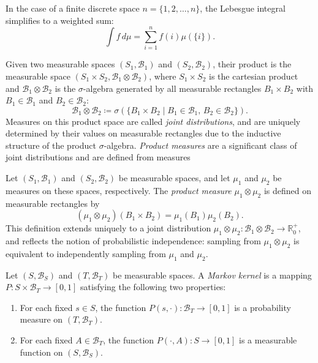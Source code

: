 In the case of a finite discrete space $n = \{1, 2, \dots, n\}$, the Lebesgue integral simplifies to a weighted sum:
$$
\int f \, d\mu = \sum_{i=1}^n f(i) \mu(\{i\}).
$$

Given two measurable spaces $(S_1, \mathcal{B}_1)$ and $(S_2, \mathcal{B}_2)$, their product is the measurable space $(S_1 \times S_2, \mathcal{B}_1 \otimes \mathcal{B}_2)$, where $S_1  \times S_2$ is the cartesian product and $\mathcal{B}_1 \otimes \mathcal{B}_2$ is the $\sigma$-algebra generated by all measurable rectangles $B_1 \times B_2$ with $B_1 \in \mathcal{B}_1$ and $B_2 \in \mathcal{B}_2$:
$$
\mathcal{B}_1 \otimes \mathcal{B}_2 \coloneqq \sigma\left(\{ B_1 \times B_2 \mid B_1 \in \mathcal{B}_1,\, B_2 \in \mathcal{B}_2 \}\right).
$$
Measures on this product space are called \emph{joint distributions}, and are uniquely determined by their values on measurable rectangles due to the inductive structure of the product $\sigma$-algebra. \emph{Product measures} are a significant class of joint distributions and are defined from measures

\begin{definition} 
   Let $(S_1, \mathcal{B}_1)$ and $(S_2, \mathcal{B}_2)$ be measurable spaces, and let $\mu_1$ and $\mu_2$ be measures on these spaces, respectively. The \emph{product measure} $\mu_1 \otimes \mu_2$ is  defined on measurable rectangles by
$$
(\mu_1 \otimes \mu_2)(B_1 \times B_2) = \mu_1(B_1)\mu_2(B_2).
$$
This definition extends uniquely to a joint distribution $\mu_1 \otimes \mu_2: \mathcal{B}_1 \otimes \mathcal{B}_2 \to \mathbb{R}_0^+$, and reflects the notion of probabilistic independence: sampling from $\mu_1 \otimes \mu_2$ is equivalent to independently sampling from $\mu_1$ and $\mu_2$.
\end{definition}


\begin{definition}
Let $(S, \mathcal{B}_S)$ and $(T, \mathcal{B}_T)$ be measurable spaces. A \emph{Markov kernel} is a mapping $P : S \times \mathcal{B}_T \to [0,1]$
satisfying the following two properties:
\begin{enumerate}
    \item For each fixed $s \in S$, the function $P(s, \cdot) : \mathcal{B}_T \to [0,1]$ is a probability measure on $(T, \mathcal{B}_T)$.
    \item For each fixed $A \in \mathcal{B}_T$, the function $P(\cdot, A) : S \to [0,1]$ is a measurable function on $(S, \mathcal{B}_S)$.
\end{enumerate}
\end{definition}


